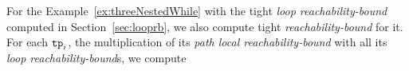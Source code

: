 For the Example~\ref{ex:threeNestedWhile} with the tight \emph{loop reachability-bound} computed in Section~\ref{sec:looprb},
we also compute tight \emph{reachability-bound} for it.
For each $\mathtt{tp}_i$, the multiplication of its \emph{path local reachability-bound} with all its \emph{loop reachability-bound}s,
we compute

%


